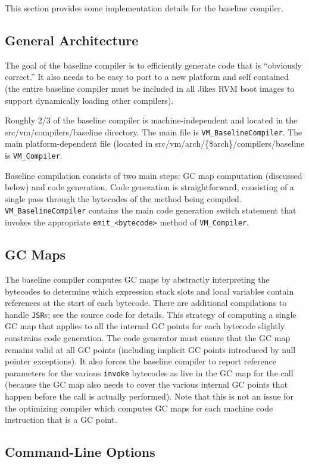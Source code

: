 This section provides some implementation details for the baseline
compiler. 

\subsection{General Architecture}
The goal of the baseline compiler is to efficiently generate code that
is ``obviously correct.'' It also needs to be easy to port to a new
platform and self contained (the entire baseline compiler must be
included in all Jikes RVM boot images to support dynamically loading
other compilers). 

Roughly 2/3 of the baseline compiler is machine-independent and
located in the src/vm/compilers/baseline directory. The main file is
{\tt VM\_BaselineCompiler}. The main platform-dependent file (located
in src/vm/arch/\{\$arch\}/compilers/baseline is {\tt VM\_Compiler}. 

Baseline compilation consists of two main steps: GC map computation
(discussed below) and code generation.  Code generation is
straightforward, consisting of a single pass through the
bytecodes of the method being compiled. {\tt VM\_BaselineCompiler}
contains the main code generation switch statement that invokes the
appropriate {\tt emit\_<bytecode>} method of {\tt VM\_Compiler}. 

\subsection{GC Maps}
The baseline compiler computes GC maps by abstractly interpreting the
bytecodes to determine which expression stack slots and local
variables contain references at the start of each bytecode. There are
additional compilations to handle {\tt JSR}s; see the source code for
details. This strategy of computing a single GC map that applies to
all the internal GC points for each bytecode slightly constrains code
generation. The code generator must ensure that the GC map remains
valid at all GC points (including implicit GC points introduced by
null pointer exceptions). It also forces the baseline compiler to
report reference parameters for the various {\tt invoke} bytecodes as
live in the GC map for the call (because the GC map also needs to
cover the various internal GC points that happen before the call is
actually performed). Note that this is not an issue for the optimizing
compiler which computes GC maps for each machine code instruction that
is a GC point. 

\subsection{Command-Line Options}

